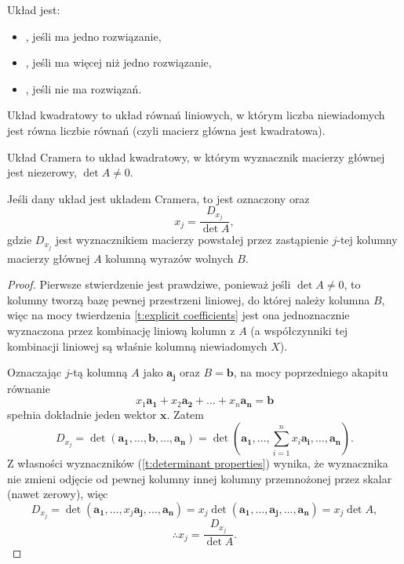 \begin{definition}
    Układ jest:
    \begin{itemize}
        \item {}, jeśli ma jedno rozwiązanie,
        \item {}, jeśli ma więcej niż jedno rozwiązanie,
        \item {}, jeśli nie ma rozwiązań.
    \end{itemize}
\end{definition}

\begin{definition}
    Układ kwadratowy to układ równań liniowych, w którym liczba niewiadomych jest równa liczbie równań (czyli macierz główna jest kwadratowa).
\end{definition}

\begin{definition}
    Układ Cramera to układ kwadratowy, w którym wyznacznik macierzy głównej jest niezerowy, $\det A \neq 0$.
\end{definition}

\begin{theorem}[Cramera]
    Jeśli dany układ jest układem Cramera, to jest oznaczony oraz
    \[ x_j = \frac{D_{x_j}}{\det A}, \]
    gdzie $D_{x_j}$ jest wyznacznikiem macierzy powstałej przez zastąpienie $j$-tej kolumny macierzy głównej $A$ kolumną wyrazów wolnych $B$.
\end{theorem}
\begin{proof}
    Pierwsze stwierdzenie jest prawdziwe, ponieważ jeśli $\det A \neq 0$, to kolumny tworzą bazę pewnej przestrzeni liniowej, do której należy kolumna $B$, więc na mocy twierdzenia \ref{t:explicit coefficients} jest ona jednoznacznie wyznaczona przez kombinację liniową kolumn z $A$ (a współczynniki tej kombinacji liniowej są właśnie kolumną niewiadomych $X$).

    Oznaczając $j$-tą kolumną $A$ jako $\mathbf{a_j}$ oraz $B = \mathbf{b}$, na mocy poprzedniego akapitu równanie
    \[ x_1\mathbf{a_1} + x_2\mathbf{a_2} + \ldots + x_n\mathbf{a_n} = \mathbf{b} \]
    spełnia dokładnie jeden wektor $\mathbf{x}$. Zatem
    \[ D_{x_j} = \det(\mathbf{a_1}, \ldots, \mathbf{b}, \ldots, \mathbf{a_n}) = \det(\mathbf{a_1}, \ldots, \sum_{i=1}^n x_i\mathbf{a_i}, \ldots, \mathbf{a_n}). \]
    Z własności wyznaczników (\ref{t:determinant properties}) wynika, że wyznacznika nie zmieni odjęcie od pewnej kolumny innej kolumny przemnożonej przez skalar (nawet zerowy), więc
    \[ D_{x_j} = \det(\mathbf{a_1}, \ldots, x_j\mathbf{a_j}, \ldots, \mathbf{a_n}) = x_j\det(\mathbf{a_1}, \ldots, \mathbf{a_j}, \ldots, \mathbf{a_n}) = x_j \det A, \]
    \[ \therefore x_j = \frac{D_{x_j}}{\det A}. \]
\end{proof}